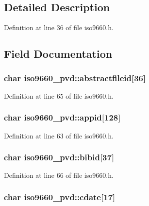 \subsection{Detailed Description}


Definition at line 36 of file iso9660.\+h.



\subsection{Field Documentation}
\hypertarget{structiso9660__pvd_aa01a9944612a700271121507c9a46977}{
\subsubsection[{abstractfileid}]{\setlength{\rightskip}{0pt plus 5cm}char iso9660\+\_\+pvd\+::abstractfileid\mbox{[}36\mbox{]}}}\label{structiso9660__pvd_aa01a9944612a700271121507c9a46977}


Definition at line 65 of file iso9660.\+h.

\hypertarget{structiso9660__pvd_a2d316bdfc5fb447d4cc8fb0d8d13222d}{
\subsubsection[{appid}]{\setlength{\rightskip}{0pt plus 5cm}char iso9660\+\_\+pvd\+::appid\mbox{[}128\mbox{]}}}\label{structiso9660__pvd_a2d316bdfc5fb447d4cc8fb0d8d13222d}


Definition at line 63 of file iso9660.\+h.

\hypertarget{structiso9660__pvd_a7f7dc75a65ede924ad50c9f687a38e72}{
\subsubsection[{bibid}]{\setlength{\rightskip}{0pt plus 5cm}char iso9660\+\_\+pvd\+::bibid\mbox{[}37\mbox{]}}}\label{structiso9660__pvd_a7f7dc75a65ede924ad50c9f687a38e72}


Definition at line 66 of file iso9660.\+h.

\hypertarget{structiso9660__pvd_a24c222ddd2ef04dda8576715e1f9af69}{
\subsubsection[{cdate}]{\setlength{\rightskip}{0pt plus 5cm}char iso9660\+\_\+pvd\+::cdate\mbox{[}17\mbox{]}}}\label{structiso9660__pvd_a24c222ddd2ef04dda8576715e1f9af69}


